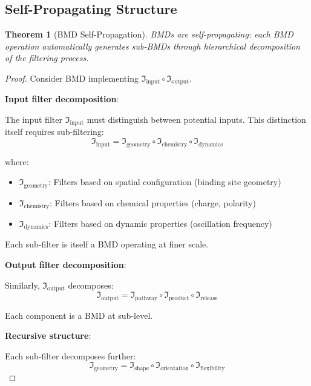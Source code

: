 \documentclass[11pt]{article}
\newtheorem{theorem}{Theorem}[section]
\theoremstyle{remark}
\begin{document}
\subsection{Self-Propagating Structure}

\begin{theorem}[BMD Self-Propagation]
\label{thm:bmd_self_propagation}
BMDs are self-propagating: each BMD operation automatically generates sub-BMDs through hierarchical decomposition of the filtering process.
\end{theorem}

\begin{proof}
Consider BMD implementing $\Im_{\text{input}} \circ \Im_{\text{output}}$.

\textbf{Input filter decomposition}:

The input filter $\Im_{\text{input}}$ must distinguish between potential inputs. This distinction itself requires sub-filtering:
\begin{equation}
\Im_{\text{input}} = \Im_{\text{geometry}} \circ \Im_{\text{chemistry}} \circ \Im_{\text{dynamics}}
\end{equation}

where:
\begin{itemize}
\item $\Im_{\text{geometry}}$: Filters based on spatial configuration (binding site geometry)
\item $\Im_{\text{chemistry}}$: Filters based on chemical properties (charge, polarity)
\item $\Im_{\text{dynamics}}$: Filters based on dynamic properties (oscillation frequency)
\end{itemize}

Each sub-filter is itself a BMD operating at finer scale.

\textbf{Output filter decomposition}:

Similarly, $\Im_{\text{output}}$ decomposes:
\begin{equation}
\Im_{\text{output}} = \Im_{\text{pathway}} \circ \Im_{\text{product}} \circ \Im_{\text{release}}
\end{equation}

Each component is a BMD at sub-level.

\textbf{Recursive structure}:

Each sub-filter decomposes further:
\begin{equation}
\Im_{\text{geometry}} = \Im_{\text{shape}} \circ \Im_{\text{orientation}} \circ \Im_{\text{flexibility}}
\end{equation}


\end{proof}
\end{document}
